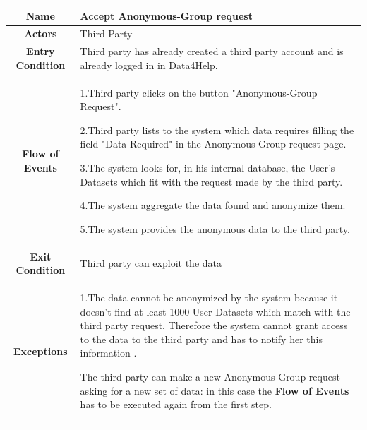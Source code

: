       \begin{table}[h!]
        \centering
        \begin{tabularx}{\linewidth}{|c|X|}
          \hline

          \textbf{Name} & Accept Anonymous-Group request\\
        	\hline

        	\textbf{Actors} & Third Party\\
        	\hline

        	\textbf{Entry Condition} & Third party has already created a third party account and is already logged in in Data4Help.\\
        	\hline

        	\textbf{Flow of Events} &
        					1.Third party clicks on the button "Anonymous-Group Request".

        					2.Third party lists to the system which data requires filling the field "Data Required" in the 							Anonymous-Group request page.

        					3.The system looks for, in his internal database, the User's Datasets  which fit with the request 						made by the third party.

        					4.The system aggregate the data found and anonymize them.

        					5.The system provides the anonymous data to the third party.\\
        	\hline

        	\textbf{Exit Condition} & Third party can exploit the data \\

        	\hline

        	\textbf{Exceptions} & 1.The data cannot be anonymized  by the system because it doesn't find at least 1000 							User Datasets which match with the third party request. Therefore the system cannot 							grant access to the data to the third party and has to notify her this information .

        						The third party can make a new Anonymous-Group request asking for a new set of data: 							in this case the \textbf{Flow of Events} has to be executed again from the first step.\\

          \hline
        \end{tabularx}
      \end{table}





